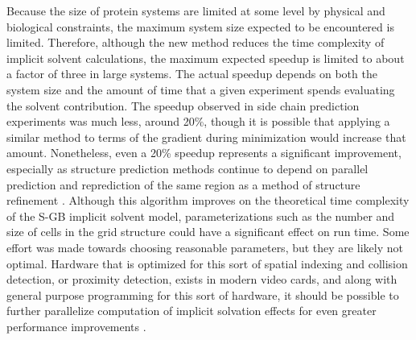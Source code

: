 Because the size of protein systems are limited at some level by physical and biological constraints, the maximum system size expected to be encountered is limited.
Therefore, although the new method reduces the time complexity of implicit solvent calculations, the maximum expected speedup is limited to about a factor of three in large systems.
The actual speedup depends on both the system size and the amount of time that a given experiment spends evaluating the solvent contribution.
The speedup observed in side chain prediction experiments was much less, around 20\%, though it is possible that applying a similar method to terms of the gradient during minimization would increase that amount.
Nonetheless, even a 20\% speedup represents a significant improvement, especially as structure prediction methods continue to depend on parallel prediction and reprediction of the same region as a method of structure refinement \cite{goldfeld2013loop}.
Although this algorithm improves on the theoretical time complexity of the S-GB implicit solvent model, parameterizations such as the number and size of cells in the grid structure could have a significant effect on run time.
Some effort was made towards choosing reasonable parameters, but they are likely not optimal.
Hardware that is optimized for this sort of spatial indexing and collision detection, or proximity detection, exists in modern video cards, and along with general purpose programming for this sort of hardware, it should be possible to further parallelize computation of implicit solvation effects for even greater performance improvements \cite{harris2008cuda}.

